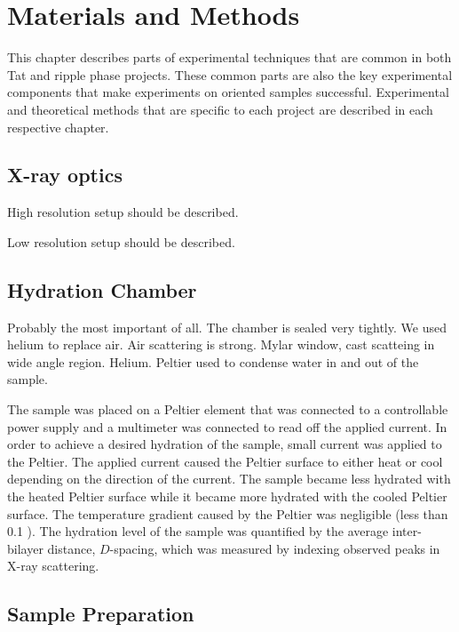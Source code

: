 \chapter{Materials and Methods}
This chapter describes parts of experimental techniques that are common
in both Tat and ripple phase projects.
These common parts are also the key experimental components that make
experiments on oriented samples successful. Experimental and theoretical
methods that are specific to each project are described in each
respective chapter.

\section{X-ray optics}
High resolution setup should be described.

Low resolution setup should be described.

\section{Hydration Chamber}
Probably the most important of all.
The chamber is sealed very tightly. We used helium to replace air. Air 
scattering is strong. 
Mylar window, cast scatteing in wide angle region. Helium. Peltier used to 
condense water in and out of the sample.  

The sample was placed on a Peltier element that was connected to a controllable 
power supply and a multimeter was connected to read off the applied
current. 
In order to achieve a desired hydration of the sample,
small current was applied to the Peltier. 
The applied current caused the Peltier surface to either heat or cool
depending on the direction of the current. The sample became less hydrated
with the heated Peltier surface while it became more hydrated with the
cooled Peltier surface.
The temperature gradient caused by the Peltier was negligible 
(less than 0.1 \textcelsius). The hydration level of the sample
was quantified by the average inter-bilayer distance, $D$-spacing,
which was measured by indexing observed peaks in X-ray scattering.

\section{Sample Preparation}
